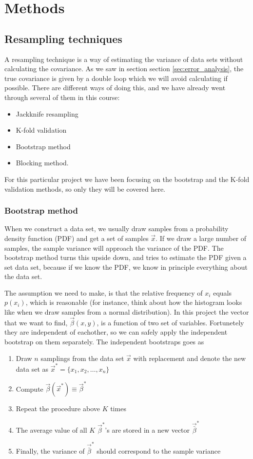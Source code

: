 \section{Methods} \label{sec:methods}

\subsection{Resampling techniques} \label{sec:resampling}
A resampling technique is a way of estimating the variance of data sets without calculating the covariance. As we saw in section section \ref{sec:error_analysis}, the true covariance is given by a double loop which we will avoid calculating if possible. There are different ways of doing this, and we have already went through several of them in this course:
\begin{itemize}
\item{Jackknife resampling}
\item{K-fold validation}
\item{Bootstrap method}
\item{Blocking method}.
\end{itemize}

For this particular project we have been focusing on the bootstrap and the K-fold validation methods, so only they will be covered here.

\subsubsection{Bootstrap method} \label{sec:bootstrap}
When we construct a data set, we usually draw samples from a probability density function (PDF) and get a set of samples $\vec{x}$. If we draw a large number of samples, the sample variance will approach the variance of the PDF. The bootstrap method turns this upside down, and tries to estimate the PDF given a set data set, because if we know the PDF, we know in principle everything about the data set. 

The assumption we need to make, is that the relative frequency of $x_i$ equals $p(x_i)$, which is reasonable (for instance, think about how the histogram looks like when we draw samples from a normal distribution). In this project the vector that we want to find, $\vec{\beta}(x,y)$, is a function of two set of variables. Fortunetely they are independent of eachother, so we can safely apply the independent bootstrap on them separately. The independent bootstraps goes as
\begin{enumerate}
\item Draw $n$ samplings from the data set $\vec{x}$ with replacement and denote the new data set as $\vec{x}^*=\{x_1,x_2,\hdots,x_n\}$
\item Compute $\vec{\beta}(\vec{x}^*)\equiv\vec{\beta}^*$
\item Repeat the procedure above $K$ times
\item The average value of all $K$ $\vec{\beta}^*$'s are stored in a new vector $\vec{\bar{\beta}}^*$
\item Finally, the variance of $\vec{\bar{\beta}}^*$ should correspond to the sample variance
\end{enumerate}
\cite{BootstrapEfron}

